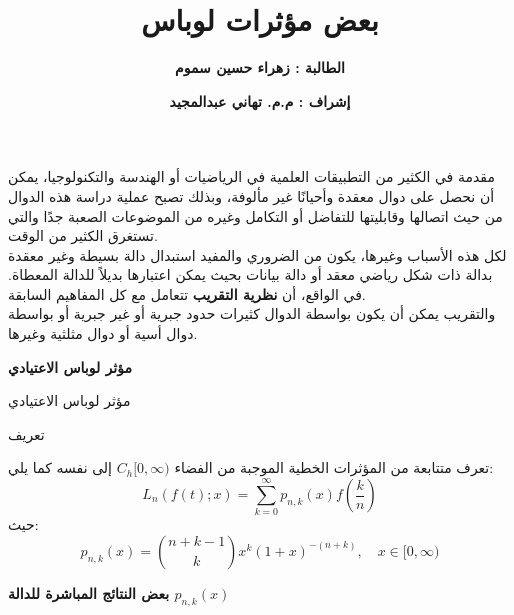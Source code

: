 


\title{
\textbf{ بعض مؤثرات لوباس}
}

\author{
\textbf{الطالبة : زهراء حسين سموم}
}
\date{
\textbf{إشراف : م.م. تهاني عبدالمجيد}
}


	\begin{frame}
		\maketitle
	\end{frame}
	
	\timesfont
	\begin{frame}{مقدمة}
		في الكثير من التطبيقات العلمية في الرياضيات أو الهندسة والتكنولوجيا، يمكن أن نحصل على دوال معقدة وأحيانًا غير مألوفة، وبذلك تصبح عملية دراسة هذه الدوال من حيث اتصالها وقابليتها للتفاضل أو التكامل وغيره من الموضوعات الصعبة جدًا والتي تستغرق الكثير من الوقت.\\
		\noindent  		
		لكل هذه الأسباب وغيرها، يكون من الضروري والمفيد استبدال دالة بسيطة وغير معقدة بدالة ذات شكل رياضي معقد أو دالة بيانات بحيث يمكن اعتبارها بديلاً للدالة المعطاة. في الواقع، أن \textbf{نظرية التقريب} تتعامل مع كل المفاهيم السابقة.\\
		\noindent
		والتقريب يمكن أن يكون بواسطة الدوال كثيرات حدود جبرية أو غير جبرية أو بواسطة دوال أسية أو دوال مثلثية وغيرها.
		
	\end{frame}
	
	\begin{frame}
\begin{center}
			\Huge\textbf{مؤثر لوباس الاعتيادي}
\end{center}
	\end{frame}
	
	\begin{frame}{مؤثر لوباس الاعتيادي}
	\begin{exampleblock}{تعريف}

		
		تعرف متتابعة من المؤثرات الخطية الموجبة من الفضاء $C_h[0, \infty)$ إلى نفسه كما يلي:
		\[
		L_n(f(t); x) = \sum_{k=0}^{\infty} p_{n,k} (x) f\left(\frac{k}{n}\right)
		\]
		حيث:
		\[
		p_{n,k} (x) = \binom{n+k-1}{k} x^k (1+x)^{-(n+k)}, \quad x \in [0, \infty)
		\]
	\end{exampleblock}
	\end{frame}
	
	\begin{frame}
		\begin{center}
			\Huge
			\textbf{بعض النتائج المباشرة للدالة $p_{n,k}(x)$}
		\end{center}
	\end{frame}
	
